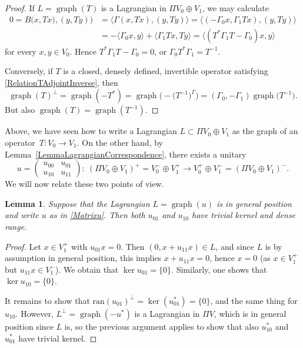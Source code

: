 \documentclass[pdftex]{sigma}
\numberwithin{equation}{section}
\newtheorem{Lemma}[Theorem]{Lemma}
\DeclareMathOperator{\graph}{\mathrm{graph}}
\begin{document}
\begin{proof}
If $L = \graph(T)$ is a Lagrangian in $\Pi V_0 \oplus V_1$, we may calculate
\begin{align*}
 0 = B\bigl(x, Tx), (y, Ty)\bigr)
 &=\langle \Gamma(x, Tx), (y, Ty)\rangle = \langle (-\Gamma_0 x, \Gamma_1Tx), (y, Ty)\rangle \\
 &= - \langle \Gamma_0 x, y\rangle + \langle \Gamma_1 Tx, Ty \rangle = \langle (T^* \Gamma_1 T - \Gamma_0) x, y\rangle
\end{align*}
for every $x, y \in V_0$.
Hence $T^* \Gamma_1 T - \Gamma_0 = 0$, or $\Gamma_0 T^* \Gamma_1 = T^{-1}$.


Conversely, if $T$ is a closed, densely defined, invertible operator satisfying \eqref{RelationTAdjointInverse}, then
\begin{equation*}
\graph(T)^\perp = \graph(-T^*) = \graph\bigl(- \big(T^{-1}\big)^\Gamma\bigr) = (\Gamma_0, -\Gamma_1)\graph\bigl(T^{-1}\bigr).
\end{equation*}
But also $\graph(T) = \graph(T^{-1})$.
\end{proof}

Above, we have seen how to write a Lagrangian $L \subset \Pi V_0 \oplus V_1$ as the graph of an operator~${T\colon V_0 \to V_1}$.
On the other hand, by Lemma~\ref{LemmaLagrangianCorrespondence}, there exists a unitary
\begin{equation} \label{Matrixu}
 u = \begin{pmatrix} u_{00} & u_{01} \\ u_{10} & u_{11} \end{pmatrix}\colon\ (\Pi V_0 \oplus V_1)^+ = V_0^- \oplus V_1^+ \longrightarrow V_0^+ \oplus V_1^- = (\Pi V_0 \oplus V_1)^-.
\end{equation}
We will now relate these two points of view.

\begin{Lemma} \label{LemmaU01TrivialKernel}
Suppose that the Lagrangian $L = \graph(u)$ is in general position and write $u$ as in \eqref{Matrixu}.
Then both $u_{01}$ and $u_{10}$ have trivial kernel and dense range.
\end{Lemma}

\begin{proof}
Let $x \in V_1^+$ with $u_{01} x = 0$.
Then $(0, x+u_{11}x) \in L$, and since $L$ is by assumption in general position, this implies $x + u_{11}x = 0$, hence $x = 0$ \big(as $x \in V_1^+$ but $u_{11}x \in V_1^-$\big).
We obtain that $\ker u_{01} = \{0\}$.
Similarly, one shows that $\ker u_{10} = \{0\}$.

It remains to show that $\mathrm{ran}(u_{01})^{\perp} = \ker(u_{01}^*) = \{0\}$, and the same thing for $u_{10}$.
However, $L^{\perp} = \graph(-u^*)$ is a Lagrangian in $\Pi V$, which is in general position since $L$ is, so the previous argument applies to show that also $u_{10}^*$ and $u_{01}^*$ have trivial kernel.
\end{proof}
\end{document}

